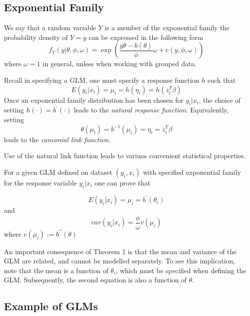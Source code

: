 \newpage
\subsection{Exponential Family}

\begin{definition}
    We say that a random variable $Y$ is a member of the exponential family the probability density of $Y = y$ can be expressed in the following form
    $$f_Y(y|\theta, \phi, \omega) = \exp\left(\frac{y\theta - b(\theta)}{\phi}\omega + c(y,\phi, \omega)\right)$$
    where $\omega=1$ in general, unless when working with grouped data.
\end{definition}
\begin{definition}
    Recall in specifying a GLM, one must specify a response function $h$ such that 
    $$E(y_i | x_i) = \mu_i = h(\eta_i) = h(z_i^T\beta)$$
    Once an exponential family distribution has been chosen for $y_i | x_i$, the choice of setting $h(\cdot) = b^\prime(\cdot)$ leads to the \textit{natural response function}. Equivalently, setting 
    $$\theta(\mu_i) = b^{-1}(\mu_i) = \eta_i = z_i^T\beta$$ leads to the \textit{canconial link function}.
\end{definition}
\begin{note} Use of the natural link function leads to variuos convenient statistical properties.
    
\end{note}
\begin{theorem}
    For a given GLM defined on dataset $(y_i, x_i)$ with specified exponential family for the response variable $y_i | x_i$ one can prove that \begin{itemize}
        $$E(y_i | x_i) = \mu_i = b^{\prime}(\theta_i)$$
        and
        $$var(y_i | x_i) = \frac{\phi}{\omega}v(\mu_i)$$
        where $v(\mu_i) := b^{\prime\prime}(\theta)$
    \end{itemize}
\end{theorem}

\begin{remark}
    An important consequence of Theorem 1 is that the mean and variance of the GLM are related, and cannot be modelled separately. To see this implication, note that the mean is a function of $\theta_i$, which must be specified when defining the GLM. Subsequently, the second equation is also a function of $\theta$.
\end{remark}

\newpage
\subsection{Example of GLMs}
    

